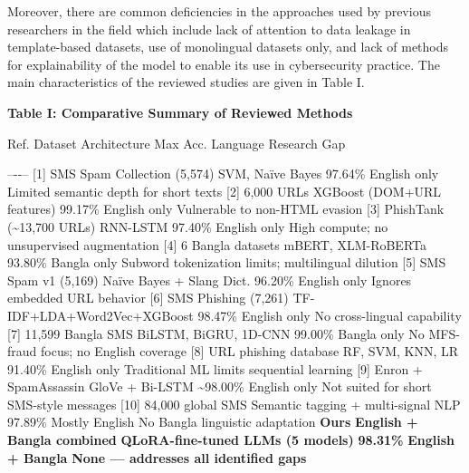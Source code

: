 Moreover, there are common deficiencies in the approaches used by
previous researchers in the field which include lack of attention to
data leakage in template-based datasets, use of monolingual datasets
only, and lack of methods for explainability of the model to enable its
use in cybersecurity practice. The main characteristics of the reviewed
studies are given in Table I.

\textbf{Table I: Comparative Summary of Reviewed Methods}

Ref. \textbar{} Dataset \textbar{} Architecture \textbar{} Max Acc.
\textbar{} Language \textbar{} Research Gap \textbar{}

\textbar\textbar\textbar--\textbar-\textbar-\textbar--\textbar{}
\textbar{} {[}1{]} \textbar{} SMS Spam Collection (5,574) \textbar{}
SVM, Naïve Bayes \textbar{} 97.64\% \textbar{} English only \textbar{}
Limited semantic depth for short texts \textbar{} \textbar{} {[}2{]}
\textbar{} 6,000 URLs \textbar{} XGBoost (DOM+URL features) \textbar{}
99.17\% \textbar{} English only \textbar{} Vulnerable to non-HTML
evasion \textbar{} \textbar{} {[}3{]} \textbar{} PhishTank
(\textasciitilde13,700 URLs) \textbar{} RNN-LSTM \textbar{} 97.40\%
\textbar{} English only \textbar{} High compute; no unsupervised
augmentation \textbar{} \textbar{} {[}4{]} \textbar{} 6 Bangla datasets
\textbar{} mBERT, XLM-RoBERTa \textbar{} 93.80\% \textbar{} Bangla only
\textbar{} Subword tokenization limits; multilingual dilution \textbar{}
\textbar{} {[}5{]} \textbar{} SMS Spam v1 (5,169) \textbar{} Naïve Bayes
+ Slang Dict. \textbar{} 96.20\% \textbar{} English only \textbar{}
Ignores embedded URL behavior \textbar{} \textbar{} {[}6{]} \textbar{}
SMS Phishing (7,261) \textbar{} TF-IDF+LDA+Word2Vec+XGBoost \textbar{}
98.47\% \textbar{} English only \textbar{} No cross-lingual capability
\textbar{} \textbar{} {[}7{]} \textbar{} 11,599 Bangla SMS \textbar{}
BiLSTM, BiGRU, 1D-CNN \textbar{} 99.00\% \textbar{} Bangla only
\textbar{} No MFS-fraud focus; no English coverage \textbar{} \textbar{}
{[}8{]} \textbar{} URL phishing database \textbar{} RF, SVM, KNN, LR
\textbar{} 91.40\% \textbar{} English only \textbar{} Traditional ML
limits sequential learning \textbar{} \textbar{} {[}9{]} \textbar{}
Enron + SpamAssassin \textbar{} GloVe + Bi-LSTM \textbar{}
\textasciitilde98.00\% \textbar{} English only \textbar{} Not suited for
short SMS-style messages \textbar{} \textbar{} {[}10{]} \textbar{}
84,000 global SMS \textbar{} Semantic tagging + multi-signal NLP
\textbar{} 97.89\% \textbar{} Mostly English \textbar{} No Bangla
linguistic adaptation \textbar{} \textbar{} \textbf{Ours} \textbar{}
\textbf{English + Bangla combined} \textbar{} \textbf{QLoRA-fine-tuned
LLMs (5 models)} \textbar{} \textbf{98.31\%} \textbar{} \textbf{English
+ Bangla} \textbar{} \textbf{None --- addresses all identified gaps}
\textbar{}

